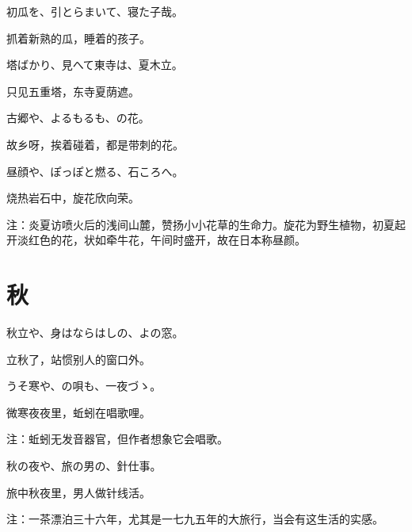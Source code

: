 \begin{haiku}
    {\FH 初瓜を、引とらまいて、寝た子哉。}

    {\FK 抓着新熟的瓜，睡着的孩子。}
\end{haiku}

\begin{haiku}
    {\FH 塔ばかり、見へて東寺は、夏木立。}

    {\FK 只见五重塔，东寺夏荫遮。}
\end{haiku}

\begin{haiku}
    {\FH 古郷や、よるもるも、の花。}

    {\FK 故乡呀，挨着碰着，都是带刺的花。}
\end{haiku}

\begin{haiku}
    {\FH 昼顔や、ぽっぽと燃る、石ころへ。}

    {\FK 烧热岩石中，旋花欣向荣。}

    {\FT 注：炎夏访喷火后的浅间山麓，赞扬小小花草的生命力。旋花为野生植物，初夏起开淡红色的花，状如牵牛花，午间时盛开，故在日本称昼颜。}
\end{haiku}

\section{\FK 秋}

\setcounter{haikucounter}{0}

\begin{haiku}
    {\FH 秋立や、身はならはしの、よの窓。}

    {\FK 立秋了，站惯别人的窗口外。}
\end{haiku}

\begin{haiku}
    {\FH うそ寒や、の唄も、一夜づゝ。}

    {\FK 微寒夜夜里，蚯蚓在唱歌哩。}

    {\FT 注：蚯蚓无发音器官，但作者想象它会唱歌。}
\end{haiku}

\begin{haiku}
    {\FH 秋の夜や、旅の男の、針仕事。}

    {\FK 旅中秋夜里，男人做针线活。}

    {\FT 注：一茶漂泊三十六年，尤其是一七九五年的大旅行，当会有这生活的实感。}
\end{haiku}

